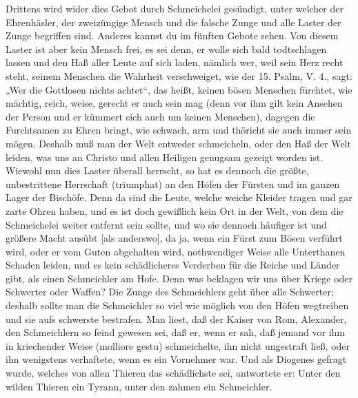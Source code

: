 Drittens wird wider dies Gebot durch Schmeichelei gesündigt, unter welcher der Ehrenhäsler, der zweizüngige Mensch und die falsche Zunge und alle Laster der Zunge begriffen sind. Anderes kannst du im fünften Gebote sehen. Von diesem Laster ist aber kein Mensch frei, es sei denn, er wolle sich bald todtschlagen lassen und den Haß aller Leute auf sich laden, nämlich wer, weil sein Herz recht steht, seinem Menschen die Wahrheit verschweiget, wie der 15. Psalm, V. 4., sagt: „Wer die Gottlosen nichts achtet“, das heißt, keinen bösen Menschen fürchtet, wie mächtig, reich, weise, gerecht er auch sein mag (denn vor ihm gilt kein Ansehen der Person und er kümmert sich auch um keinen Menschen), dagegen die Furchtsamen zu Ehren bringt, wie schwach, arm und thöricht sie auch immer sein mögen. Deshalb muß man der Welt entweder schmeicheln, oder den Haß der Welt leiden, was uns an Christo und allen Heiligen genugsam gezeigt worden ist. Wiewohl nun dies Laster überall herrscht, so hat es dennoch die größte, unbestrittene Herrschaft (triumphat) an den Höfen der Fürsten und im ganzen Lager der Bischöfe. Denn da sind die Leute, welche weiche Kleider tragen und gar zarte Ohren haben, und es ist doch gewißlich kein Ort in der Welt, von dem die Schmeichelei weiter entfernt sein sollte, und wo sie dennoch häufiger ist und größere Macht ausübt [als anderswo], da ja, wenn ein Fürst zum Bösen verführt wird, oder er vom Guten abgehalten wird, nothwendiger Weise alle Unterthanen Schaden leiden, und es kein schädlicheres Verderben für die Reiche und Länder gibt, als einen Schmeichler am Hofe. Denn was beklagen wir uns über Kriege oder Schwerter oder Waffen? Die Zunge des Schmeichlers geht über alle Schwerter; deshalb sollte man die Schmeichler so viel wie möglich von den Höfen wegtreiben und sie aufs schwerste bestrafen. Man liest, daß der Kaiser von Rom, Alexander, den Schmeichlern so feind gewesen sei, daß er, wenn er sah, daß jemand vor ihm in kriechender Weise (molliore gestu) schmeichelte, ihn nicht ungestraft ließ, oder ihn wenigstens verhaftete, wenn es ein Vornehmer war. Und als Diogenes gefragt wurde, welches von allen Thieren das schädlichste sei, antwortete er: Unter den wilden Thieren ein Tyrann, unter den zahmen ein Schmeichler.


